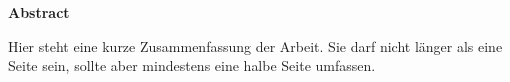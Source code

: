 \vspace*{2cm}

\begin{center}
    \textbf{Abstract}
\end{center}

\vspace*{1cm}

\noindent Hier steht eine kurze Zusammenfassung der Arbeit. Sie darf nicht länger als eine Seite sein, sollte aber mindestens eine halbe Seite umfassen.
